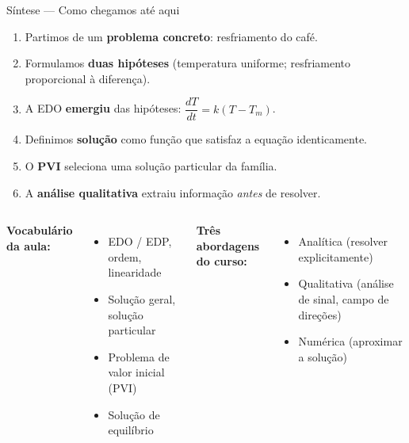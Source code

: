 \documentclass[12pt]{beamer}
\begin{document}
\begin{frame}{Síntese — Como chegamos até aqui}

  \begin{enumerate}
    \setlength\itemsep{8pt}
    \item Partimos de um \textbf{problema concreto}: resfriamento do café.
    \item Formulamos \textbf{duas hipóteses} (temperatura uniforme;
          resfriamento proporcional à diferença).
    \item A EDO \textbf{emergiu} das hipóteses:
          $\dfrac{dT}{dt} = k(T - T_m)$.
    \item Definimos \textbf{solução} como função que satisfaz
          a equação identicamente.
    \item O \textbf{PVI} seleciona uma solução particular da família.
    \item A \textbf{análise qualitativa} extraiu informação
          \emph{antes} de resolver.
  \end{enumerate}

  \vspace{10pt}
  \pause

  \begin{columns}[T]
      \textbf{Vocabulário da aula:}
      \begin{itemize}
        \item EDO / EDP, ordem, linearidade
        \item Solução geral, solução particular
        \item Problema de valor inicial (PVI)
        \item Solução de equilíbrio
      \end{itemize}
      \textbf{Três abordagens do curso:}
      \begin{itemize}
        \item Analítica (resolver explicitamente)
        \item Qualitativa (análise de sinal, campo de direções)
        \item Numérica (aproximar a solução)
      \end{itemize}
  \end{columns}

\end{frame}

\end{document}
